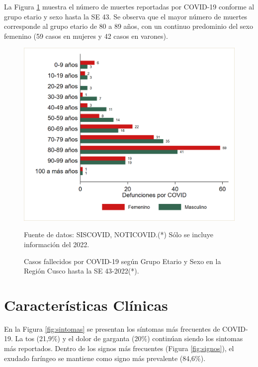 \documentclass[12pt,a4paper,openany]{book}
\begin{document}
	
	La Figura \ref{fig:fallecidos_edad_sexo}  muestra el número de muertes reportadas por COVID-19 conforme al grupo etario y sexo hasta la SE 43.  Se observa que el mayor número de muertes corresponde al grupo etario de 80
	a 89 años, con un continuo predominio del sexo femenino (59 casos en mujeres y 42 casos en varones).
%	
	\begin{figure}[h]
		\caption{Casos fallecidos por COVID-19 según Grupo Etario y Sexo en la Región Cusco hasta la SE 43-2022(*).}\label{fig:fallecidos_edad_sexo}
		\begin{center}
			\includegraphics[width=0.75\linewidth]{../figuras/defunciones_etapavida_2022}
		\end{center}
		{\footnotesize {Fuente de datos: SISCOVID, NOTICOVID.(*) Sólo se incluye información del 2022.}}
	\end{figure}
%	
	
	
	\cleardoublepage
	
	
	\clearpage

	
	\section*{Características Clínicas}
	\noindent En la Figura \ref{fig:sintomas} se presentan los síntomas más frecuentes  de COVID-19. La tos (21,9$\%$) y el dolor de garganta (20$\%$) continúan siendo los sintomas más reportados. Dentro de los signos más frecuentes (Figura \ref{fig:signos}), el exudado faríngeo se mantiene como signo más prevalente (84,6$\%$). 
	
\end{document}
